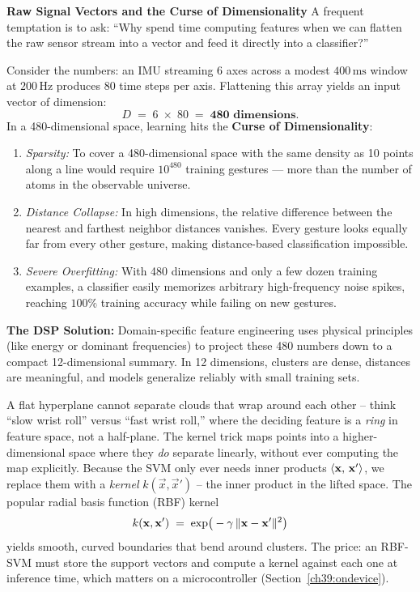 \begin{trapbox}
\textbf{Raw Signal Vectors and the Curse of Dimensionality}
A frequent temptation is to ask: ``Why spend time computing features when we can flatten the raw sensor stream into a vector and feed it directly into a classifier?''

Consider the numbers: an IMU streaming 6 axes across a modest $400\,\text{ms}$ window at $200\,\text{Hz}$ produces $80$ time steps per axis. Flattening this array yields an input vector of dimension:
\[
  D \;=\; 6 \;\times\; 80 \;=\; \mathbf{480 \text{ dimensions}}.
\]
In a 480-dimensional space, learning hits the \textbf{Curse of Dimensionality}:
\begin{enumerate}
  \item \emph{Sparsity:} To cover a 480-dimensional space with the same density as 10 points along a line would require $10^{480}$ training gestures --- more than the number of atoms in the observable universe.
  \item \emph{Distance Collapse:} In high dimensions, the relative difference between the nearest and farthest neighbor distances vanishes. Every gesture looks equally far from every other gesture, making distance-based classification impossible.
  \item \emph{Severe Overfitting:} With 480 dimensions and only a few dozen training examples, a classifier easily memorizes arbitrary high-frequency noise spikes, reaching $100\%$ training accuracy while failing on new gestures.
\end{enumerate}
\textbf{The DSP Solution:} Domain-specific feature engineering uses physical principles (like energy or dominant frequencies) to project these 480 numbers down to a compact 12-dimensional summary. In 12 dimensions, clusters are dense, distances are meaningful, and models generalize reliably with small training sets.
\end{trapbox}

A flat hyperplane cannot separate clouds that wrap around each other -- think ``slow
wrist roll'' versus ``fast wrist roll,'' where the deciding feature is a \emph{ring} in
feature space, not a half-plane. The kernel trick maps points into a higher-dimensional
space where they \emph{do} separate linearly, without ever computing the map explicitly.
Because the SVM only ever needs inner products $\langle \mathbf{x},\, \mathbf{x}' \rangle$, we replace
them with a \emph{kernel} $k(\vec{x},\vec{x}')$ -- the inner product in the lifted space.
The popular radial basis function (RBF) kernel
\[
  k(\mathbf{x},\mathbf{x}') \;=\; \exp\!\big(-\gamma\,\lVert\mathbf{x}-\mathbf{x}'\rVert^2\big)
\]
yields smooth, curved boundaries that bend around clusters. The price: an RBF-SVM must
store the support vectors and compute a kernel against each one at inference time, which
matters on a microcontroller (Section~\ref{ch39:ondevice}).

